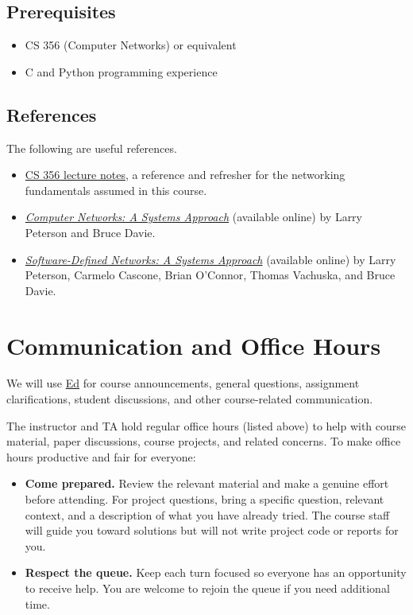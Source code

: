 \documentclass[11pt]{article}
\newcommand{\ed}{https://edstem.org/us/courses/100553/}
\begin{document}
\subsection{Prerequisites}
\begin{itemize}
  \item CS 356 (Computer Networks) or equivalent
  \item C and Python programming experience
\end{itemize}

\subsection{References}
The following are useful references.
\begin{itemize}
  \item \href{https://utcs356.github.io/sp26/schedule/}{CS 356 lecture notes}, a reference and refresher for the networking fundamentals assumed in this course.
  \item \href{https://book.systemsapproach.org/}{\emph{Computer Networks: A Systems Approach}} (available online) by Larry Peterson and Bruce Davie.
  \item \href{https://sdn.systemsapproach.org/index.html}{\emph{Software-Defined Networks: A Systems Approach}} (available online) by Larry Peterson, Carmelo Cascone, Brian O'Connor, Thomas Vachuska, and Bruce Davie.
\end{itemize}

\section{Communication and Office Hours}

We will use \href{\ed}{Ed} for course announcements, general questions,
assignment clarifications, student discussions, and other course-related
communication.

The instructor and TA hold regular office hours (listed above) to help with
course material, paper discussions, course projects, and related concerns.
To make office hours productive and fair for everyone:
\begin{itemize}
  \item \textbf{Come prepared.} Review the relevant material and make a genuine effort before attending. For project questions, bring a specific question, relevant context, and a description of what you have already tried. The course staff will guide you toward solutions but will not write project code or reports for you.
  \item \textbf{Respect the queue.} Keep each turn focused so everyone has an opportunity to receive help. You are welcome to rejoin the queue if you need additional time.
\end{itemize}
\end{document}
